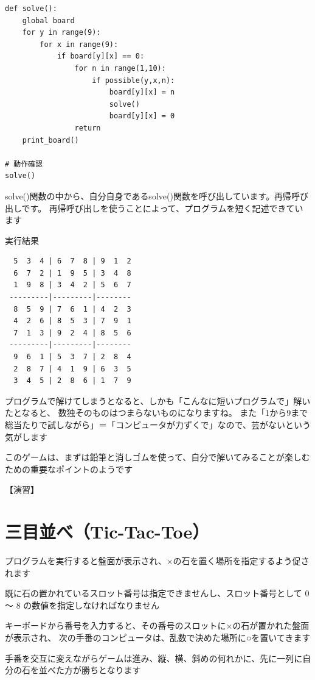 \documentclass[uplatex,a4paper,11pt,oneside,openany]{jsbook}
\begin{document}
\begin{lstlisting}[caption=solve,label=sudoku03]
def solve():
    global board
    for y in range(9):
        for x in range(9):
            if board[y][x] == 0:
                for n in range(1,10):
                    if possible(y,x,n):
                        board[y][x] = n
                        solve()
                        board[y][x] = 0
                return
    print_board()

# 動作確認
solve()
\end{lstlisting}

solve()関数の中から、自分自身であるsolve()関数を呼び出しています。再帰呼び出しです。
再帰呼び出しを使うことによって、プログラムを短く記述できています

実行結果

\begin{verbatim}
  5  3  4 | 6  7  8 | 9  1  2
  6  7  2 | 1  9  5 | 3  4  8
  1  9  8 | 3  4  2 | 5  6  7
 ---------|---------|--------
  8  5  9 | 7  6  1 | 4  2  3
  4  2  6 | 8  5  3 | 7  9  1
  7  1  3 | 9  2  4 | 8  5  6
 ---------|---------|--------
  9  6  1 | 5  3  7 | 2  8  4
  2  8  7 | 4  1  9 | 6  3  5
  3  4  5 | 2  8  6 | 1  7  9
\end{verbatim}

プログラムで解けてしまうとなると、しかも「こんなに短いプログラムで」解いたとなると、
数独そのものはつまらないものになりますね。
また「1から9まで総当たりで試しながら」＝「コンピュータが力ずくで」なので、芸がないという気がします

このゲームは、まずは鉛筆と消しゴムを使って、自分で解いてみることが楽しむための重要なポイントのようです

【演習】

\section{三目並べ（Tic-Tac-Toe）}

プログラムを実行すると盤面が表示され、×の石を置く場所を指定するよう促されます

既に石の置かれているスロット番号は指定できませんし、スロット番号として 0 〜 8 の数値を指定しなければなりません

キーボードから番号を入力すると、その番号のスロットに×の石が置かれた盤面が表示され、
次の手番のコンピュータは、乱数で決めた場所に○を置いてきます

手番を交互に変えながらゲームは進み、縦、横、斜めの何れかに、先に一列に自分の石を並べた方が勝ちとなります
\end{document}
